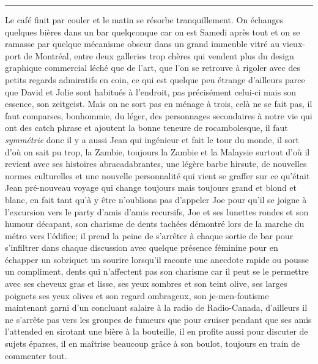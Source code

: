 \begin{center}\noindent\rule{0.5\textwidth}{0.4pt}\end{center} Le café finit par
couler et le matin se résorbe tranquillement. On échanges quelques bières dans
un bar quelqconque car on est Samedi après tout et on se ramasse par quelque
mécanisme obscur dans un grand immeuble vitré au vieux-port de Montréal, entre
deux galleries trop chères qui vendent plus du design graphique commercial léché
que de l'art, que l'on se retrouve à rigoler avec des petits regards admiratifs
en coin, ce qui est quelque peu étrange d'ailleurs parce que David
et Jolie sont habitués à l'endroit, pas précisément celui-ci mais son essence,
son zeitgeist. Mais on ne sort pas en ménage à trois, celà ne se fait pas,
il faut comparses, bonhommie, du léger, des personnages secondaires
à notre vie qui ont des catch phrase et ajoutent la bonne teneure de 
rocambolesque, il faut \emph{symmétrie} donc il y a aussi Jean qui ingénieur et
fait le tour du monde, il sort d'où on sait pu trop, la Zambie, toujours la
Zambie et la Malaysie surtout d'où il revient avec ses histoires
abracadabrantes, une légère barbe hirsute, de nouvelles normes culturelles et
une nouvelle personnalité qui vient se graffer sur ce qu'était Jean pré-nouveau
voyage qui change toujours mais toujours grand et blond et blanc, en fait tant
qu'à y être n'oublions pas d'appeler Joe pour qu'il se joigne à l'excursion vers
le party d'amis d'amis recursifs, Joe et  ses lunettes rondes et son humour
décapant, son charisme de dents tachées démontré lors de la marche du métro
vers l'édifice; il prend la peine de s'arrêter à chaque sortie de bar
pour s'infiltrer dans chaque discussion avec quelque présence féminine pour
en échapper un sobriquet un sourire lorsqu'il raconte une anecdote rapide
ou pousse un compliment, dents qui n'affectent pas son charisme
car il peut se le permettre avec ses cheveux gras et lisse, ses yeux sombres et
son teint olive, ses larges poignets ses yeux olives et son regard ombrageux,
son je-men-foutisme maintenant garni d'un concluant salaire à la radio de
Radio-Canada, d'ailleurs il ne s'arrête pas vers les groupes de fumeurs
que pour cruiser pendant que ses amis l'attended en sirotant une bière à
la bouteille, il en profite aussi pour discuter de sujets éparses, il en maîtrise
beaucoup grâce à son boulot, toujours en train de commenter tout.\\

